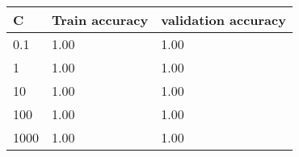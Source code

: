 \def\arraystretch{1.25}
\begin{center}
\begin{longtable}{l l l }
\hline
\hline
\textbf{C} & \textbf{Train accuracy} & \textbf{validation accuracy} \\
\hline
\hline
0.1 & 1.00 & 1.00\\
1 & 1.00 & 1.00\\
10 & 1.00 & 1.00\\
100 & 1.00 & 1.00\\
1000 & 1.00 & 1.00\\
\hline
\end{longtable}
\end{center}